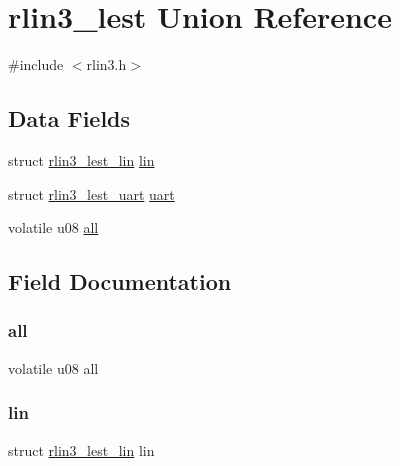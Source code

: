 \hypertarget{unionrlin3__lest}{}\section{rlin3\+\_\+lest Union Reference}
\label{unionrlin3__lest}


{\ttfamily \#include $<$rlin3.\+h$>$}

\subsection*{Data Fields}
\begin{DoxyCompactItemize}
\item 
struct \mbox{\hyperlink{structrlin3__lest__lin}{rlin3\+\_\+lest\+\_\+lin}} \mbox{\hyperlink{unionrlin3__lest_abbdd7c403f51812364ce5e9a04ad8c30}{lin}}
\item 
struct \mbox{\hyperlink{structrlin3__lest__uart}{rlin3\+\_\+lest\+\_\+uart}} \mbox{\hyperlink{unionrlin3__lest_ad3c2fc16b672914e613e25d8a094ae71}{uart}}
\item 
volatile u08 \mbox{\hyperlink{unionrlin3__lest_a38c4e44ae84c133f8be54b77d93f7279}{all}}
\end{DoxyCompactItemize}


\subsection{Field Documentation}
\mbox{\label{unionrlin3__lest_a38c4e44ae84c133f8be54b77d93f7279}} 
\subsubsection{\texorpdfstring{all}{all}}
{\footnotesize\ttfamily volatile u08 all}

\mbox{\label{unionrlin3__lest_abbdd7c403f51812364ce5e9a04ad8c30}} 
\subsubsection{\texorpdfstring{lin}{lin}}
{\footnotesize\ttfamily struct \mbox{\hyperlink{structrlin3__lest__lin}{rlin3\+\_\+lest\+\_\+lin}} lin}


